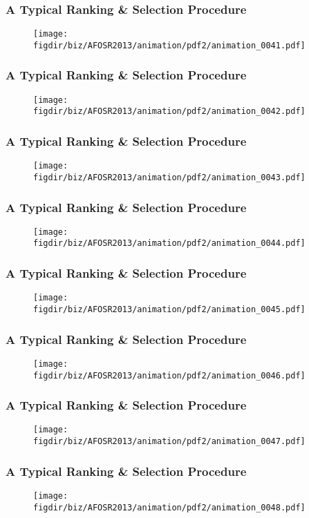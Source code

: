 \documentclass[13pt]{beamer}
\newcommand{\figdir}{../../fig}
\begin{document}
{\begin{frame}\frametitle{A Typical Ranking \& Selection Procedure}\begin{figure}\texttt{[image: \\figdir/biz/AFOSR2013/animation/pdf2/animation\_0041.pdf]}\end{figure}\end{frame}
\begin{frame}\frametitle{A Typical Ranking \& Selection Procedure}\begin{figure}\texttt{[image: \\figdir/biz/AFOSR2013/animation/pdf2/animation\_0042.pdf]}\end{figure}\end{frame}
\begin{frame}\frametitle{A Typical Ranking \& Selection Procedure}\begin{figure}\texttt{[image: \\figdir/biz/AFOSR2013/animation/pdf2/animation\_0043.pdf]}\end{figure}\end{frame}
\begin{frame}\frametitle{A Typical Ranking \& Selection Procedure}\begin{figure}\texttt{[image: \\figdir/biz/AFOSR2013/animation/pdf2/animation\_0044.pdf]}\end{figure}\end{frame}
\begin{frame}\frametitle{A Typical Ranking \& Selection Procedure}\begin{figure}\texttt{[image: \\figdir/biz/AFOSR2013/animation/pdf2/animation\_0045.pdf]}\end{figure}\end{frame}
\begin{frame}\frametitle{A Typical Ranking \& Selection Procedure}\begin{figure}\texttt{[image: \\figdir/biz/AFOSR2013/animation/pdf2/animation\_0046.pdf]}\end{figure}\end{frame}
\begin{frame}\frametitle{A Typical Ranking \& Selection Procedure}\begin{figure}\texttt{[image: \\figdir/biz/AFOSR2013/animation/pdf2/animation\_0047.pdf]}\end{figure}\end{frame}
\begin{frame}\frametitle{A Typical Ranking \& Selection Procedure}\begin{figure}\texttt{[image: \\figdir/biz/AFOSR2013/animation/pdf2/animation\_0048.pdf]}\end{figure}\end{frame}
}
\end{document}
